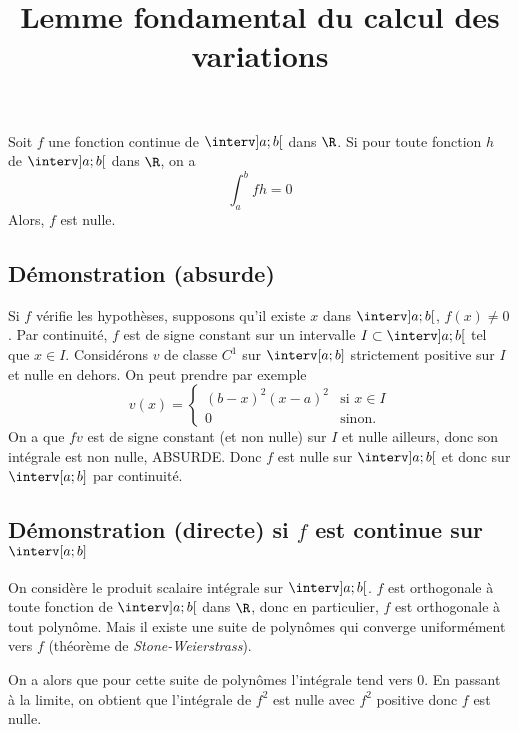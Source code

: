 \documentclass[fontsize=12pt,twoside=false,parskip=half, french]{scrartcl}
\title{Lemme fondamental du calcul des variations}
\date{}
\author{}
\begin{document}
\maketitle
   \begin{Theoreme}
      Soit $f$ une fonction continue de $\interv]a; b[$ dans $\R$. Si pour toute fonction
      $h$ de $\interv]a; b[$ dans $\R$, on a
      \[
         \int_a^b fh = 0
      \]
      Alors, $f$ est nulle.
   \end{Theoreme}
   \subsection{Démonstration (absurde)}
      Si $f$ vérifie les hypothèses, supposons qu’il existe $x$ dans $\interv]a; b[$, 
      $f(x) \neq 0$. Par continuité, $f$ est de signe constant sur un intervalle $I \subset \interv]a; b[$ tel que $x \in I$. Considérons $v$ de classe $C^1$ sur 
      $\interv[a; b]$ strictement positive sur $I$ et nulle en dehors. On peut prendre 
      par exemple
      \[
         v(x) = \begin{cases}
            (b - x)^2(x - a)^2 & \text{si } x \in I\\
            0                  & \text{sinon}.
         \end{cases}
      \]
      On a que $fv$ est de signe constant (et non nulle) sur $I$ et nulle ailleurs, donc 
      son intégrale est non nulle, ABSURDE. Donc $f$ est nulle sur $\interv]a; b[$ et donc
      sur $\interv[a; b]$ par continuité.
      
   \subsection{Démonstration (directe) si $f$ est continue sur $\interv[a; b]$}
      On considère le produit scalaire intégrale sur $\interv]a; b[$. $f$ est 
      orthogonale à toute fonction de $\interv]a; b[$ dans $\R$, donc en particulier, 
      $f$ est orthogonale à tout polynôme. Mais il existe une suite de polynômes
      qui converge uniformément vers $f$ (théorème de \emph{Stone-Weierstrass}).
      
      On a alors que pour cette suite de polynômes l'intégrale tend vers $0$. 
      En passant à la limite, on obtient que l'intégrale de $f^2$ est nulle 
      avec $f^2$ positive donc $f$ est nulle.
\end{document}
